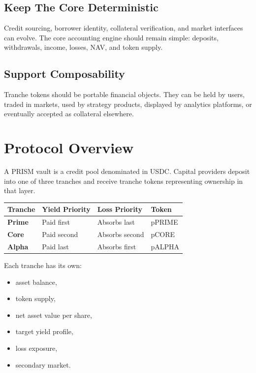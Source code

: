\documentclass[11pt]{article}
\begin{document}
\subsection{Keep The Core Deterministic}

Credit sourcing, borrower identity, collateral verification, and market
interfaces can evolve. The core accounting engine should remain simple:
deposits, withdrawals, income, losses, NAV, and token supply.

\subsection{Support Composability}

Tranche tokens should be portable financial objects. They can be held by users,
traded in markets, used by strategy products, displayed by analytics platforms,
or eventually accepted as collateral elsewhere.

\section{Protocol Overview}

A PRISM vault is a credit pool denominated in USDC. Capital providers deposit
into one of three tranches and receive tranche tokens representing ownership in
that layer.

\begin{center}
\begin{tabular}{>{\bfseries}p{}p{}p{}p{}}
\toprule
Tranche & Yield Priority & Loss Priority & Token \\
\midrule
Prime & Paid first & Absorbs last & pPRIME \\
Core & Paid second & Absorbs second & pCORE \\
Alpha & Paid last & Absorbs first & pALPHA \\
\bottomrule
\end{tabular}
\end{center}

Each tranche has its own:

\begin{itemize}
  \item asset balance,
  \item token supply,
  \item net asset value per share,
  \item target yield profile,
  \item loss exposure,
  \item secondary market.
\end{itemize}
\end{document}
